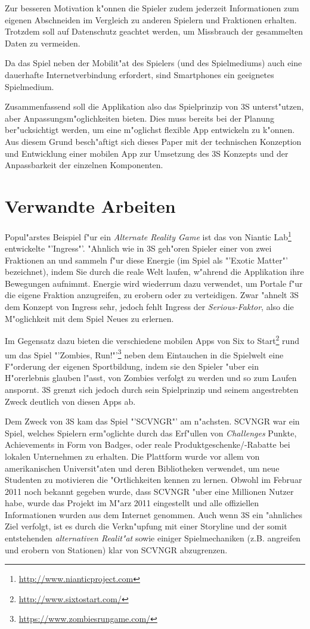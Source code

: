 \documentclass{article}
\begin{document}
Zur besseren Motivation k"onnen die Spieler zudem jederzeit Informationen zum eigenen Abschneiden im Vergleich zu anderen Spielern und Fraktionen erhalten. Trotzdem soll auf Datenschutz geachtet werden, um Missbrauch der gesammelten Daten zu vermeiden.

Da das Spiel neben der Mobilit"at des Spielers (und des Spielmediums) auch eine dauerhafte Internetverbindung erfordert, sind Smartphones ein geeignetes Spielmedium. 

Zusammenfassend soll die Applikation also das Spielprinzip von 3S unterst"utzen, aber Anpassungsm"oglichkeiten bieten. Dies muss bereits bei der Planung ber"ucksichtigt werden, um eine m"oglichst flexible App entwickeln zu k"onnen. Aus diesem Grund besch"aftigt sich dieses Paper mit der technischen Konzeption und Entwicklung einer mobilen App zur Umsetzung des 3S Konzepts und der Anpassbarkeit der einzelnen Komponenten.

\section{Verwandte Arbeiten}
\label{sec:verw_arbeiten}
Popul"arstes Beispiel f"ur ein \textit{Alternate Reality Game} ist das von Niantic Lab\footnote{\url{http://www.nianticproject.com}} entwickelte "'Ingress"'. "Ahnlich wie in 3S geh"oren Spieler einer von zwei Fraktionen an und sammeln f"ur diese Energie (im Spiel als "'Exotic Matter"' bezeichnet), indem Sie durch die reale Welt laufen, w"ahrend die Applikation ihre Bewegungen aufnimmt. Energie wird wiederrum dazu verwendet, um Portale f"ur die eigene Fraktion anzugreifen, zu erobern oder zu verteidigen. Zwar "ahnelt 3S dem Konzept von Ingress sehr, jedoch fehlt Ingress der \textit{Serious-Faktor}, also die M"oglichkeit mit dem Spiel Neues zu erlernen.

Im Gegensatz dazu bieten die verschiedene mobilen Apps von Six to Start\footnote{\url{http://www.sixtostart.com/}} rund um das Spiel "'Zombies, Run!"'\footnote{\url{https://www.zombiesrungame.com/}} neben dem Eintauchen in die Spielwelt eine F"orderung der eigenen Sportbildung, indem sie den Spieler "uber ein H"orerlebnis glauben l"asst, von Zombies verfolgt zu werden und so zum Laufen anspornt. 3S grenzt sich jedoch durch sein Spielprinzip und seinem angestrebten Zweck deutlich von diesen Apps ab.

Dem Zweck von 3S kam das Spiel "'SCVNGR"' am n"achsten. SCVNGR war ein Spiel, welches Spielern erm"oglichte durch das Erf"ullen von \textit{Challenges} Punkte, Achievements in Form von Badges, oder reale Produktgeschenke/-Rabatte bei lokalen Unternehmen zu erhalten. Die Plattform wurde vor allem von amerikanischen Universit"aten und deren Bibliotheken verwendet\cite{mcmunn2013if}, um neue Studenten zu motivieren die "Ortlichkeiten kennen zu lernen. Obwohl im Februar 2011 noch bekannt gegeben wurde, dass SCVNGR "uber eine Millionen Nutzer habe, wurde das Projekt im M"arz 2011 eingestellt und alle offiziellen Informationen wurden aus dem Internet genommen. Auch wenn 3S ein "ahnliches Ziel verfolgt, ist es durch die Verkn"upfung mit einer Storyline und der somit entstehenden \textit{alternativen Realit"at} sowie einiger Spielmechaniken (z.B. angreifen und erobern von Stationen) klar von SCVNGR abzugrenzen.
\end{document}
